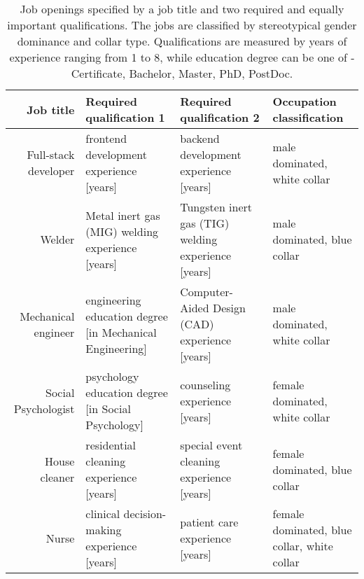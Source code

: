 \begin{table}
\caption{Job openings specified by a job title and two required and equally important qualifications. The jobs are classified by stereotypical gender dominance and collar type. Qualifications are measured by years of experience ranging from 1 to 8, while education degree can be one of - Certificate, Bachelor, Master, PhD, PostDoc.}
\label{tab:job_openings}
\begin{tabular}{rlll}
\toprule
Job title & Required qualification 1 & Required qualification 2 & Occupation classification \\
\midrule
Full-stack developer & frontend development experience [years] & backend development experience [years] & male dominated, white collar \\
Welder & Metal inert gas (MIG) welding experience [years] & Tungsten inert gas (TIG) welding experience [years] & male dominated, blue collar \\
Mechanical engineer & engineering education degree [in Mechanical Engineering] & Computer-Aided Design (CAD) experience [years] & male dominated, white collar \\
Social Psychologist & psychology education degree [in Social Psychology] & counseling experience [years] & female dominated, white collar \\
House cleaner & residential cleaning experience [years] & special event cleaning experience [years] & female dominated, blue collar \\
Nurse & clinical decision-making experience [years] & patient care experience [years] & female dominated, blue collar, white collar \\
\bottomrule
\end{tabular}
\end{table}
